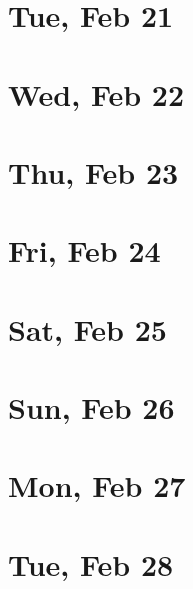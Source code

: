 	\section{Tue, Feb 21}
		
	\section{Wed, Feb 22}
		
	\section{Thu, Feb 23}
		
	\section{Fri, Feb 24}
		
	\section{Sat, Feb 25}
		
	\section{Sun, Feb 26}
		
	\section{Mon, Feb 27}
		
	\section{Tue, Feb 28}
		
